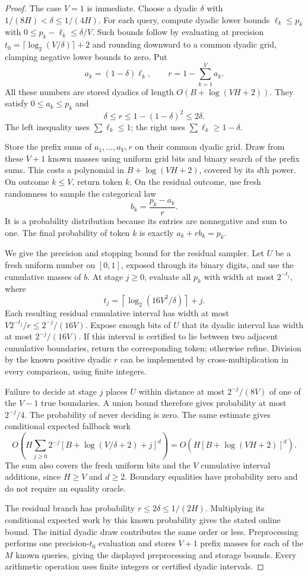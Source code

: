 \begin{proof}
The case $V=1$ is immediate. Choose a dyadic $\delta$ with
$1/(8H)<\delta\le1/(4H)$. For each query, compute dyadic lower
bounds $\ell_k\le p_k$ with
$0\le p_k-\ell_k\le\delta/V$. Such bounds follow by evaluating at
precision $t_0=\lceil\log_2(V/\delta)\rceil+2$ and rounding
downward to a common dyadic grid, clamping negative lower bounds to
zero. Put
\[
 a_k=(1-\delta)\ell_k,\qquad r=1-\sum_{k=1}^V a_k.
\]
All these numbers are stored dyadics of length
$O(B+\log(VH+2))$. They satisfy $0\le a_k\le p_k$ and
\[
 \delta\le r\le1-(1-\delta)^2\le2\delta.
\]
The left inequality uses $\sum\ell_k\le1$; the right uses
$\sum\ell_k\ge1-\delta$.

Store the prefix sums of $a_1,\ldots,a_V,r$ on their common dyadic
grid. Draw from these $V+1$ known masses using uniform grid bits
and binary search of the prefix sums. This costs a polynomial in
$B+\log(VH+2)$, covered by its $d$th power. On outcome $k\le V$,
return token $k$. On the residual outcome, use fresh randomness to
sample the categorical law
\[
 b_k=\frac{p_k-a_k}{r}.
\]
It is a probability distribution because its entries are nonnegative
and sum to one. The final probability of token $k$ is exactly
$a_k+rb_k=p_k$.

We give the precision and stopping bound for the residual sampler.
Let $U$ be a fresh uniform number on $[0,1]$, exposed through its
binary digits, and use the cumulative masses of $b$. At stage
$j\ge0$, evaluate all $p_k$ with width at most $2^{-t_j}$, where
\[
 t_j=\left\lceil\log_2(16V^2/\delta)\right\rceil+j.
\]
Each resulting residual cumulative interval has width at most
$V2^{-t_j}/r\le2^{-j}/(16V)$. Expose enough bits of $U$ that its
dyadic interval has width at most $2^{-j}/(16V)$. If this interval
is certified to lie between two adjacent cumulative boundaries,
return the corresponding token; otherwise refine.
Division by the known positive dyadic $r$ can be implemented by
cross-multiplication in every comparison, using finite integers.

Failure to decide at stage $j$ places $U$ within distance at most
$2^{-j}/(8V)$ of one of the $V-1$ true boundaries. A union bound
therefore gives probability at most $2^{-j}/4$. The probability of
never deciding is zero. The same estimate gives conditional expected
fallback work
\[
 O\!\left(
 H\sum_{j\ge0}2^{-j}[B+\log(V/\delta+2)+j]^d
 \right)
 =O\!\left(H[B+\log(VH+2)]^d\right).
\]
The sum also covers the fresh uniform bits and the $V$ cumulative
interval additions, since $H\ge V$ and $d\ge2$. Boundary equalities
have probability zero and do not require an equality oracle.

The residual branch has probability $r\le2\delta\le1/(2H)$.
Multiplying its conditional expected work by this known probability
gives the stated online bound. The initial dyadic draw contributes
the same order or less. Preprocessing performs one precision-$t_0$
evaluation and stores $V+1$ prefix masses for each of the $M$ known
queries, giving the displayed preprocessing and storage bounds.
Every arithmetic operation uses finite integers or certified dyadic
intervals.
\end{proof}

